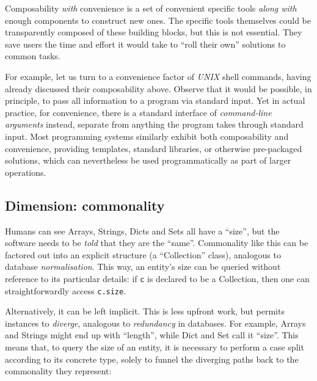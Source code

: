 \documentclass[ twoside,openright,titlepage,numbers=noenddot,headinclude,footinclude,cleardoublepage=empty,abstract=on,
                BCOR=5mm,paper=a4,fontsize=11pt
                ]{scrreprt}
\newcommand{\note}[1]{}
\theoremstyle{definition}
\begin{document}
Composability \emph{with} convenience is a set of convenient specific
tools \emph{along with} enough components to construct new ones. The
specific tools themselves could be transparently composed of these
building blocks, but this is not essential. They save users the time and
effort it would take to ``roll their own'' solutions to common tasks.

For example, let us turn to a convenience factor of \emph{UNIX} shell
commands, having already discussed their composability above. Observe
that it would be possible, in principle, to pass all information to a
program via standard input. Yet in actual practice, for convenience,
there is a standard interface of \emph{command-line arguments} instead,
separate from anything the program takes through standard input. Most
programming systems similarly exhibit both composability and
convenience, providing templates, standard libraries, or otherwise
pre-packaged solutions, which can nevertheless be used programmatically
as part of larger operations.

\note{ex: something in the UI world? one click vs. long winded "principled" way of doing the thing? (macros? applescript?)}

\hypertarget{dimension-commonality}{\subsection{Dimension: commonality}\label{dimension-commonality}}

\note{JE This seems like data modelling issues that happen during application design, not programming system design.}

Humans can see Arrays, Strings, Dicts and Sets all have a ``size'', but
the software needs to be \emph{told} that they are the ``same''.
Commonality like this can be factored out into an explicit structure (a
``Collection'' class), analogous to database \emph{normalisation}. This
way, an entity's size can be queried without reference to its particular
details: if \texttt{c} is declared to be a Collection, then one can
straightforwardly access \texttt{c.size}.

Alternatively, it can be left implicit. This is less upfront work, but
permits instances to \emph{diverge}, analogous to \emph{redundancy} in
databases. For example, Arrays and Strings might end up with ``length'',
while Dict and Set call it ``size''. This means that, to query the size
of an entity, it is necessary to perform a case split according to its
concrete type, solely to funnel the diverging paths back to the
commonality they represent:
\end{document}
